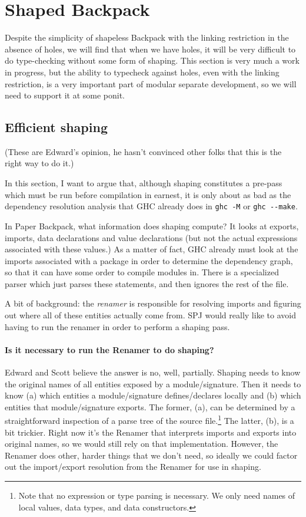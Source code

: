 \documentclass{article}
\begin{document}
\section{Shaped Backpack}

Despite the simplicity of shapeless Backpack with the linking
restriction in the absence of holes, we will find that when we have
holes, it will be very difficult to do type-checking without
some form of shaping.  This section is very much a work in progress,
but the ability to typecheck against holes, even with the linking restriction,
is a very important part of modular separate development, so we will need
to support it at some ponit.

\subsection{Efficient shaping}

(These are Edward's opinion, he hasn't convinced other folks that this is
the right way to do it.)

In this section, I want to argue that, although shaping constitutes
a pre-pass which must be run before compilation in earnest, it is only
about as bad as the dependency resolution analysis that GHC already does
in \verb|ghc -M| or \verb|ghc --make|.

In Paper Backpack, what information does shaping compute? It looks at
exports, imports, data declarations and value declarations (but not the
actual expressions associated with these values.)  As a matter of fact,
GHC already must look at the imports associated with a package in order
to determine the dependency graph, so that it can have some order to compile
modules in.  There is a specialized parser which just parses these statements,
and then ignores the rest of the file.

A bit of background: the \emph{renamer} is responsible for resolving
imports and figuring out where all of these entities actually come from.
SPJ would really like to avoid having to run the renamer in order to perform
a shaping pass.

\paragraph{Is it necessary to run the Renamer to do shaping?}
Edward and Scott believe the answer is no, well, partially.
Shaping needs to know the original names of all entities exposed by a
module/signature. Then it needs to know (a) which entities a module/signature
defines/declares locally and (b) which entities that module/signature exports.
The former, (a), can be determined by a straightforward inspection of a parse
tree of the source file.\footnote{Note that no expression or type parsing
is necessary. We only need names of local values, data types, and data
constructors.} The latter, (b), is a bit trickier. Right now it's the Renamer
that interprets imports and exports into original names, so we would still
rely on that implementation. However, the Renamer does other, harder things
that we don't need, so ideally we could factor out the import/export
resolution from the Renamer for use in shaping.
\end{document}
